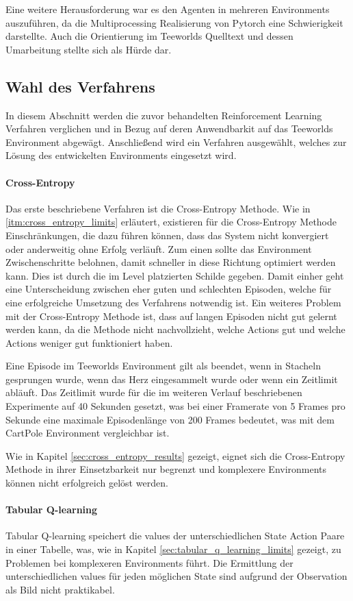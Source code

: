 \documentclass[11pt]{scrartcl}
\begin{document}
Eine weitere Herausforderung war es den Agenten in mehreren Environments auszuführen, da
die Multiprocessing Realisierung von Pytorch eine Schwierigkeit darstellte. Auch die
Orientierung im Teeworlds Quelltext und dessen Umarbeitung stellte sich als Hürde dar.

\subsection{Wahl des Verfahrens}
In diesem Abschnitt werden die zuvor behandelten Reinforcement Learning Verfahren
verglichen und in Bezug auf deren Anwendbarkit auf das Teeworlds Environment abgewägt.
Anschließend wird ein Verfahren ausgewählt, welches zur Lösung des entwickelten
Environments eingesetzt wird.

\paragraph{Cross-Entropy}
Das erste beschriebene Verfahren ist die Cross-Entropy Methode. Wie in
\autoref{itm:cross_entropy_limits} erläutert, existieren für die Cross-Entropy Methode
Einschränkungen, die dazu führen können, dass das System nicht konvergiert oder anderweitig
ohne Erfolg verläuft. Zum einen sollte das Environment Zwischenschritte belohnen,
damit schneller in diese Richtung optimiert werden kann. Dies ist durch die im Level
platzierten Schilde gegeben. Damit einher geht eine Unterscheidung zwischen eher guten
und schlechten Episoden, welche für eine erfolgreiche Umsetzung des Verfahrens notwendig
ist. Ein weiteres Problem mit der Cross-Entropy Methode ist, dass auf langen Episoden
nicht gut gelernt werden kann, da die Methode nicht nachvollzieht, welche Actions gut
und welche Actions weniger gut funktioniert haben. 

Eine Episode im Teeworlds Environment gilt als beendet, wenn in Stacheln gesprungen wurde, 
wenn das Herz eingesammelt wurde oder wenn ein Zeitlimit abläuft. Das Zeitlimit wurde für
die im weiteren Verlauf beschriebenen Experimente auf 40 Sekunden gesetzt, was bei einer
Framerate von 5 Frames pro Sekunde eine maximale Episodenlänge von 200 Frames bedeutet,
was mit dem CartPole Environment vergleichbar ist. %

Wie in Kapitel \ref{sec:cross_entropy_results} gezeigt, eignet sich die Cross-Entropy
Methode in ihrer Einsetzbarkeit nur begrenzt und komplexere Environments können nicht
erfolgreich gelöst werden.

\paragraph{Tabular Q-learning}
Tabular Q-learning speichert die values der unterschiedlichen State Action Paare in einer
Tabelle, was, wie in Kapitel \ref{sec:tabular_q_learning_limits} gezeigt, zu Problemen bei
komplexeren Environments führt. Die Ermittlung der unterschiedlichen values für jeden
möglichen State sind aufgrund der Observation als Bild nicht praktikabel.
\end{document}
